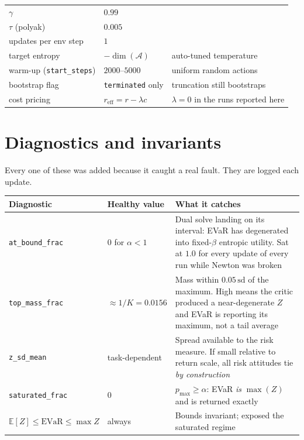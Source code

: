 \documentclass[11pt,a4paper]{article}
\newcommand{\evar}{\mathrm{EVaR}}
\begin{document}
\begin{center}
\begin{longtable}{@{}p{}p{}p{}@{}}
$\gamma$ & $0.99$ & \\
$\tau$ (polyak) & $0.005$ & \\
updates per env step & $1$ & \\
target entropy & $-\dim(\mathcal{A})$ & auto-tuned temperature \\
warm-up (\texttt{start\_steps}) & $2000$--$5000$ & uniform random actions \\
bootstrap flag & \texttt{terminated} only & truncation still bootstraps \\
cost pricing & $r_{\text{eff}} = r - \lambda c$ & $\lambda = 0$ in the runs reported here \\
\bottomrule
\end{longtable}
\end{center}

\section{Diagnostics and invariants}

Every one of these was added because it caught a real fault. They are logged each
update.

\begin{center}
\small
\begin{tabular}{@{}p{}p{}p{}@{}}
\toprule
\textbf{Diagnostic} & \textbf{Healthy value} & \textbf{What it catches} \\
\midrule
\texttt{at\_bound\_frac} & $0$ for $\alpha<1$ &
  Dual solve landing on its interval: EVaR has degenerated into fixed-$\beta$
  entropic utility. Sat at $1.0$ for every update of every run while Newton was
  broken \\[0.3em]
\texttt{top\_mass\_frac} & $\approx 1/K = 0.0156$ &
  Mass within $0.05\,\mathrm{sd}$ of the maximum. High means the critic produced a
  near-degenerate $Z$ and EVaR is reporting its maximum, not a tail average \\[0.3em]
\texttt{z\_sd\_mean} & task-dependent &
  Spread available to the risk measure. If small relative to return scale, all
  risk attitudes tie \emph{by construction} \\[0.3em]
\texttt{saturated\_frac} & $0$ &
  $p_{\max} \ge \alpha$: EVaR \emph{is} $\max(Z)$ and is returned exactly \\[0.3em]
$\mathbb{E}[Z] \le \evar \le \max Z$ & always &
  Bounds invariant; exposed the saturated regime \\
\bottomrule
\end{tabular}
\end{center}
\end{document}
